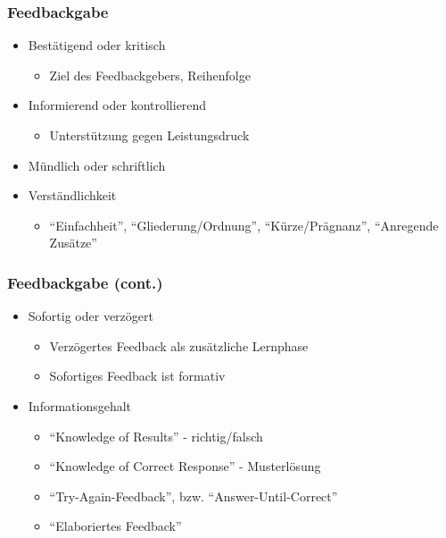 \begin{frame}[<+->]
	\frametitle{Feedbackgabe}
	\begin{itemize}
		\item Bestätigend oder kritisch 
		\begin{itemize}
			\item Ziel des Feedbackgebers, Reihenfolge
		\end{itemize}
		\item Informierend oder kontrollierend
		\begin{itemize}
			\item Unterstützung gegen Leistungsdruck
		\end{itemize}
		\item Mündlich oder schriftlich
		\item Verständlichkeit
		\begin{itemize}
			\item ``Einfachheit'', ``Gliederung/Ordnung'', ``Kürze/Prägnanz'', ``Anregende Zusätze''
		\end{itemize}
	\end{itemize}
\end{frame}

\begin{frame}[<+->]
	\frametitle{Feedbackgabe (cont.)}
	\begin{itemize}
		\item Sofortig oder verzögert
		\begin{itemize}
			\item Verzögertes Feedback als zusätzliche Lernphase
			\item Sofortiges Feedback ist formativ
		\end{itemize}
		\item Informationsgehalt
		\begin{itemize}
			\item ``Knowledge of Results'' - richtig/falsch
			\item ``Knowledge of Correct Response'' - Musterlösung
			\item ``Try-Again-Feedback'', bzw. ``Answer-Until-Correct''
			\item ``Elaboriertes Feedback''
		\end{itemize}
	\end{itemize}
\end{frame}

